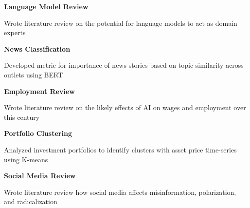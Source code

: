 \documentclass[10pt]{article}
\newcommand{\resumeListHeading}[1]{\vspace*{5pt}\textbf{#1}}
\newcommand{\resumeProject}[2]{
    \resumeListHeading{#1}
    \begin{itemize*}[label=$|$]
        \item #2
    \end{itemize*}
}
\begin{document}
\resumeProject{Language Model Review}{
    Wrote literature review on the potential for language models to act as domain experts
}

\resumeProject{News Classification}{
    Developed metric for importance of news stories based on topic similarity across outlets using BERT
}

\resumeProject{Employment Review}{
    Wrote literature review on the likely effects of AI on wages and employment over this century
}

\resumeProject{Portfolio Clustering}{
    Analyzed investment portfolios to identify clusters with asset price time-series using K-means
}

\resumeProject{Social Media Review}{
    Wrote literature review how social media affects misinformation, polarization, and radicalization
}
\end{document}
